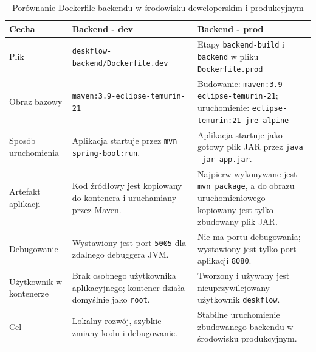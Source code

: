 \begin{table}[h!]
\centering
\small
\caption{Porównanie Dockerfile backendu w środowisku deweloperskim i produkcyjnym}
\label{tab:dockerfile-backend-dev-prod}
\begin{tabular}{|p{}|p{}|p{}|}
\hline
\textbf{Cecha} & \textbf{Backend - dev} & \textbf{Backend - prod} \\
\hline
Plik & \texttt{deskflow-backend/Dockerfile.dev} & Etapy \texttt{backend-build} i \texttt{backend} w pliku \texttt{Dockerfile.prod} \\
\hline
Obraz bazowy & \texttt{maven:3.9-eclipse-temurin-21} & Budowanie: \texttt{maven:3.9-eclipse-temurin-21}; uruchomienie: \texttt{eclipse-temurin:21-jre-alpine} \\
\hline
Sposób uruchomienia & Aplikacja startuje przez \texttt{mvn spring-boot:run}. & Aplikacja startuje jako gotowy plik JAR przez \texttt{java -jar app.jar}. \\
\hline
Artefakt aplikacji & Kod źródłowy jest kopiowany do kontenera i uruchamiany przez Maven. & Najpierw wykonywane jest \texttt{mvn package}, a do obrazu uruchomieniowego kopiowany jest tylko zbudowany plik JAR. \\
\hline
Debugowanie & Wystawiony jest port \texttt{5005} dla zdalnego debuggera JVM. & Nie ma portu debugowania; wystawiony jest tylko port aplikacji \texttt{8080}. \\
\hline
Użytkownik w kontenerze & Brak osobnego użytkownika aplikacyjnego; kontener działa domyślnie jako \texttt{root}. & Tworzony i używany jest nieuprzywilejowany użytkownik \texttt{deskflow}. \\
\hline
Cel & Lokalny rozwój, szybkie zmiany kodu i debugowanie. & Stabilne uruchomienie zbudowanego backendu w środowisku produkcyjnym. \\
\hline
\end{tabular}
\end{table}

